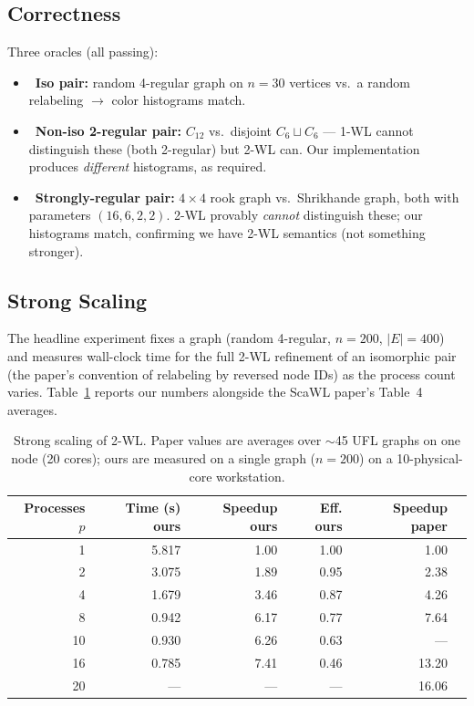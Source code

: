 \documentclass[11pt]{article}
\newcommand{\paperval}[1]{\textcolor{paperblue}{#1}}
\newcommand{\ourval}[1]{\textcolor{oursred}{#1}}
\newcommand{\good}{\textcolor{darkgreen}{\checkmark}}
\begin{document}
\subsection{Correctness}
Three oracles (all passing):
\begin{itemize}[leftmargin=1.5em,itemsep=2pt]
  \item \good\ \textbf{Iso pair:} random 4-regular graph on $n{=}30$ vertices vs.\ a random relabeling $\to$ color histograms match.
  \item \good\ \textbf{Non-iso 2-regular pair:} $C_{12}$ vs.\ disjoint $C_6 \sqcup C_6$ --- 1-WL cannot distinguish these (both 2-regular) but 2-WL can. Our implementation produces \emph{different} histograms, as required.
  \item \good\ \textbf{Strongly-regular pair:} $4{\times}4$ rook graph vs.\ Shrikhande graph, both with parameters $(16,6,2,2)$. 2-WL provably \emph{cannot} distinguish these; our histograms match, confirming we have 2-WL semantics (not something stronger).
\end{itemize}

\subsection{Strong Scaling}
The headline experiment fixes a graph (random 4-regular, $n{=}200$, $|E|{=}400$) and measures wall-clock time for the full 2-WL refinement of an isomorphic pair (the paper's convention of relabeling by reversed node IDs) as the process count varies. Table~\ref{tab:strong} reports our numbers alongside the ScaWL paper's Table~4 averages.

\begin{table}[H]
\centering
\caption{Strong scaling of 2-WL. \paperval{Paper} values are averages over $\sim$45 UFL graphs on one node (20 cores); \ourval{ours} are measured on a single graph ($n{=}200$) on a 10-physical-core workstation.}
\label{tab:strong}
\begin{tabular}{rrrrrr}
\toprule
Processes $p$ & Time (s) \ourval{ours} & Speedup \ourval{ours} & Eff. \ourval{ours} & Speedup \paperval{paper} \\
\midrule
1  & 5.817 & 1.00 & 1.00 & 1.00  \\
2  & 3.075 & 1.89 & 0.95 & 2.38  \\
4  & 1.679 & 3.46 & 0.87 & 4.26  \\
8  & 0.942 & 6.17 & 0.77 & 7.64  \\
10 & 0.930 & 6.26 & 0.63 & ---   \\
16 & 0.785 & 7.41 & 0.46 & 13.20 \\
20 & ---   & ---  & ---  & 16.06 \\
\bottomrule
\end{tabular}
\end{table}
\end{document}
